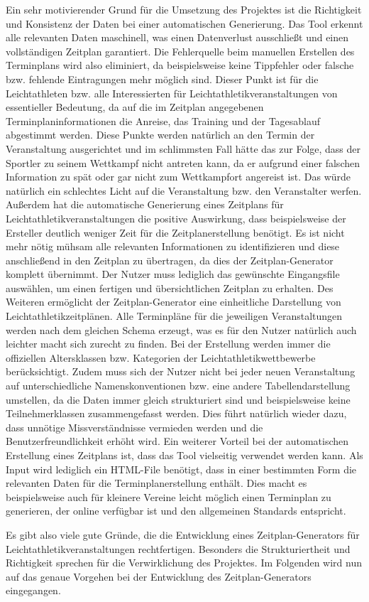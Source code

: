 Ein sehr motivierender Grund für die Umsetzung des Projektes ist die Richtigkeit und Konsistenz der Daten bei einer automatischen Generierung. Das Tool erkennt alle relevanten Daten maschinell, was einen Datenverlust ausschließt und einen vollständigen Zeitplan garantiert. Die Fehlerquelle beim manuellen Erstellen des Terminplans wird also eliminiert, da beispielsweise keine Tippfehler oder falsche bzw. fehlende Eintragungen mehr möglich sind. Dieser Punkt ist für die Leichtathleten bzw. alle Interessierten für Leichtathletikveranstaltungen von essentieller Bedeutung, da auf die im Zeitplan angegebenen Terminplaninformationen die Anreise, das Training und der Tagesablauf abgestimmt werden. Diese Punkte werden natürlich an den Termin der Veranstaltung ausgerichtet und im schlimmsten Fall hätte das zur Folge, dass der Sportler zu seinem Wettkampf nicht antreten kann, da er aufgrund einer falschen Information zu spät oder gar nicht zum Wettkampfort angereist ist. Das würde natürlich ein schlechtes Licht auf die Veranstaltung bzw. den Veranstalter werfen.
Außerdem hat die automatische Generierung eines Zeitplans für Leichtathletikveranstaltungen die positive Auswirkung, dass beispielsweise der Ersteller deutlich weniger Zeit für die Zeitplanerstellung benötigt. Es ist nicht mehr nötig mühsam alle relevanten Informationen zu identifizieren und diese anschließend in den Zeitplan zu übertragen, da dies der Zeitplan-Generator komplett übernimmt. Der Nutzer muss lediglich das gewünschte Eingangsfile auswählen, um einen fertigen und übersichtlichen Zeitplan zu erhalten. 
Des Weiteren ermöglicht der Zeitplan-Generator eine einheitliche Darstellung von Leichtathletikzeitplänen. Alle Terminpläne für die jeweiligen Veranstaltungen werden nach dem gleichen Schema erzeugt, was es für den Nutzer natürlich auch leichter macht sich zurecht zu finden. Bei der Erstellung werden immer die offiziellen Altersklassen bzw. Kategorien der Leichtathletikwettbewerbe berücksichtigt. Zudem muss sich der Nutzer nicht bei jeder neuen Veranstaltung auf unterschiedliche Namenskonventionen bzw. eine andere Tabellendarstellung umstellen, da die Daten immer gleich strukturiert sind und beispielsweise keine Teilnehmerklassen zusammengefasst werden. Dies führt natürlich wieder dazu, dass unnötige Missverständnisse vermieden werden und die Benutzerfreundlichkeit erhöht wird.
Ein weiterer Vorteil bei der automatischen Erstellung eines Zeitplans ist, dass das Tool vielseitig verwendet werden kann. Als Input wird lediglich ein HTML-File benötigt, dass in einer bestimmten Form die relevanten Daten für die Terminplanerstellung enthält. Dies macht es beispielsweise auch für kleinere Vereine leicht möglich einen Terminplan zu generieren, der online verfügbar ist und den allgemeinen Standards entspricht.

Es gibt also viele gute Gründe, die die Entwicklung eines Zeitplan-Generators für Leichtathletikveranstaltungen rechtfertigen. Besonders die Strukturiertheit und Richtigkeit sprechen für die Verwirklichung des Projektes. Im Folgenden wird nun auf das genaue Vorgehen bei der Entwicklung des Zeitplan-Generators eingegangen.



